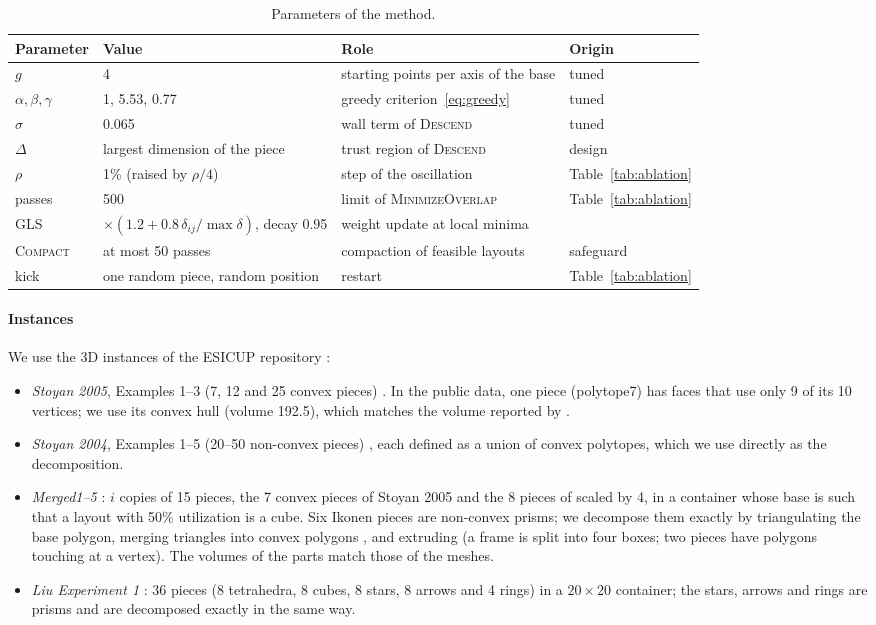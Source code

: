 \documentclass[preprint,12pt,authoryear]{elsarticle}
\begin{document}
\begin{table}[!tbp]
\centering\small
\caption{Parameters of the method.}\label{tab:params}
\begin{tabular}{lp{}p{}l}
\toprule
Parameter & Value & Role & Origin\\
\midrule
$g$ & 4 & starting points per axis of the base & tuned\\
$\alpha,\beta,\gamma$ & 1, 5.53, 0.77 & greedy criterion~\eqref{eq:greedy} & tuned\\
$\sigma$ & 0.065 & wall term of \textsc{Descend} & tuned\\
$\Delta$ & largest dimension of the piece & trust region of \textsc{Descend} & design\\
$\rho$ & 1\% (raised by $\rho/4$) & step of the oscillation & Table~\ref{tab:ablation}\\
passes & 500 & limit of \textsc{MinimizeOverlap} & Table~\ref{tab:ablation}\\
GLS & $\times(1.2+0.8\,\delta_{ij}/\max\delta)$, decay 0.95 & weight update at local minima & \citet{gardeyn2025}\\
\textsc{Compact} & at most 50 passes & compaction of feasible layouts & safeguard\\
kick & one random piece, random position & restart & Table~\ref{tab:ablation}\\
\bottomrule
\end{tabular}
\end{table}

\paragraph{Instances}
We use the 3D instances of the ESICUP repository \citep{esicup}:
\begin{itemize}
\item \emph{Stoyan 2005}, Examples 1--3 (7, 12 and 25 convex pieces) \citep{stoyan2005}. In the public data, one
piece (polytope7) has faces that use only 9 of its 10 vertices; we use its convex hull (volume 192.5), which
matches the volume reported by \citet{egeblad2009}.
\item \emph{Stoyan 2004}, Examples 1--5 (20--50 non-convex pieces) \citep{stoyan2004}, each defined as a union of
convex polytopes, which we use directly as the decomposition.
\item \emph{Merged1--5} \citep{egeblad2009}: $i$ copies of 15 pieces, the 7 convex pieces of Stoyan 2005 and the
8 pieces of \citet{ikonen1997} scaled by 4, in a container whose base is such that a layout with 50\%
utilization is a cube. Six Ikonen pieces are non-convex prisms; we decompose them exactly by triangulating the
base polygon, merging triangles into convex polygons \citep{hertel1983}, and extruding (a frame is split into
four boxes; two pieces have polygons touching at a vertex). The volumes of the parts match those of the meshes.
\item \emph{Liu Experiment 1} \citep{liu2015}: 36 pieces (8 tetrahedra, 8 cubes, 8 stars, 8 arrows and 4 rings)
in a $20\times20$ container; the stars, arrows and rings are prisms and are decomposed exactly in the same way.
\end{itemize}
\end{document}
